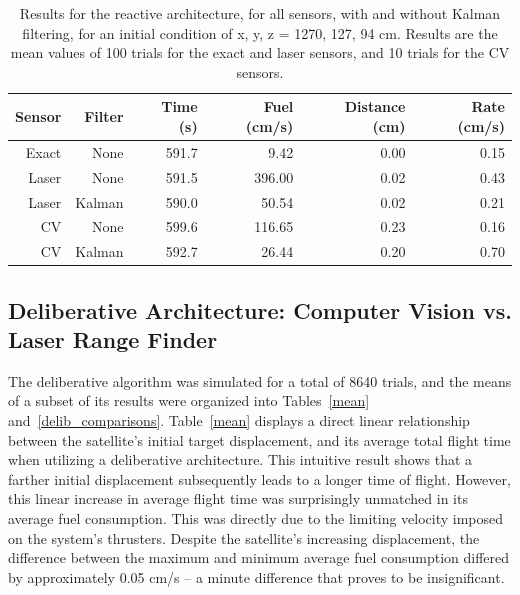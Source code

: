 \documentclass[journal, 10pt]{IEEEtran}
\begin{document}
\begin{table}
\centering
\normalsize
\caption{\label{react_comparisons}Results for the reactive architecture, for all sensors, with and without Kalman filtering, for an initial condition of x, y, z = 1270, 127, 94 cm. Results are the mean values of 100 trials for the exact and laser sensors, and 10 trials for the CV sensors.}
\begin{tabular}{r r | r r r r }
\toprule
Sensor & Filter & Time (s) & Fuel (cm/s) & Distance (cm) & Rate (cm/s) \\
\midrule
 Exact &   None &    591.7 &        9.42 &          0.00 &        0.15 \\
 Laser &   None &    591.5 &      396.00 &          0.02 &        0.43 \\
 Laser & Kalman &    590.0 &       50.54 &          0.02 &        0.21 \\
    CV &   None &    599.6 &      116.65 &          0.23 &        0.16 \\
    CV & Kalman &    592.7 &       26.44 &          0.20 &        0.70 \\
\bottomrule
\end{tabular}
\end{table}

\subsection{Deliberative Architecture: Computer Vision vs. Laser Range Finder}

The deliberative algorithm was simulated for a total of 8640 trials, and the means of a subset of its results were organized into Tables~\ref{mean} and~\ref{delib_comparisons}. Table~\ref{mean} displays a direct linear relationship between the satellite's initial target displacement, and its average total flight time when utilizing a deliberative architecture. This intuitive result shows that a farther initial displacement subsequently leads to a longer time of flight. However, this linear increase in average flight time was surprisingly unmatched in its average fuel consumption. This was directly due to the limiting velocity imposed on the system's thrusters. Despite the satellite's increasing displacement, the difference between the maximum and minimum average fuel consumption differed by approximately 0.05 cm/s -- a minute difference that proves to be insignificant. 
\end{document}
